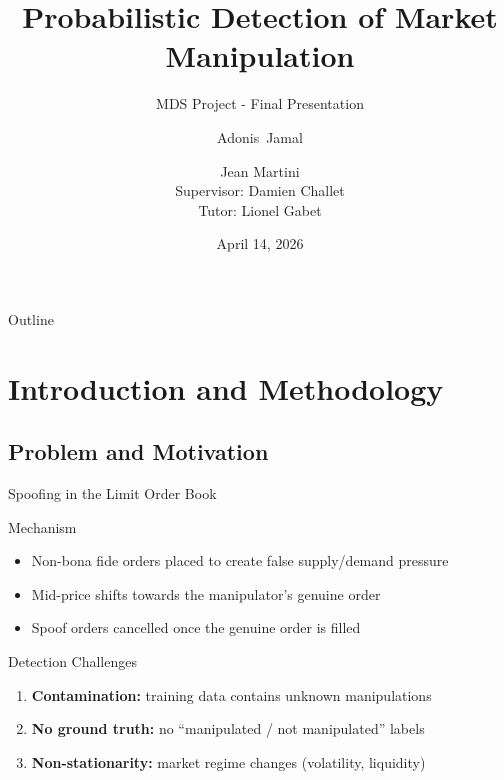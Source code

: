 \documentclass{beamer}
\title{Probabilistic Detection of Market Manipulation}
\subtitle{MDS Project - Final Presentation}
\author{Adonis~Jamal \and Jean Martini\\Supervisor: Damien Challet\\Tutor: Lionel Gabet}
\institute{CentraleSupélec -- MICS Laboratory}
\date{April 14, 2026}
\begin{document}
\frame{\titlepage}

\begin{frame}{Outline}
    \tableofcontents
\end{frame}


\section{Introduction and Methodology}
\subsection{Problem and Motivation}

\begin{frame}{Spoofing in the Limit Order Book}
    \begin{block}{Mechanism}
        \begin{itemize}
            \item Non-bona fide orders placed to create false supply/demand pressure
            \item Mid-price shifts towards the manipulator's genuine order
            \item Spoof orders cancelled once the genuine order is filled
        \end{itemize}
    \end{block}
    \begin{alertblock}{Detection Challenges}
        \begin{enumerate}
            \item \textbf{Contamination:} training data contains unknown manipulations
            \item \textbf{No ground truth:} no ``manipulated / not manipulated'' labels
            \item \textbf{Non-stationarity:} market regime changes (volatility, liquidity)
        \end{enumerate}
    \end{alertblock}
\end{frame}
\end{document}
